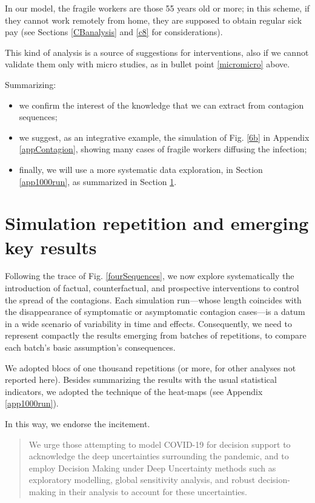 \documentclass[11pt]{article}
\begin{document}
In our model, the fragile workers are those 55 years old or more; in this scheme, if they cannot work remotely from home, they are supposed to obtain regular sick pay (see Sections \ref{CBanalysis} and \ref{c8} for considerations).

This kind of analysis is a source of suggestions for interventions, also if we cannot validate them only with micro studies, as in bullet point \ref{micromicro} above. 

Summarizing: 

\begin{itemize}
\setlength{\itemsep}{0pt}
\item we confirm the interest of the knowledge that we can extract from contagion sequences; 
\item we suggest, as an integrative example, the simulation of Fig. \ref{6b}  in Appendix \ref{appContagion}, showing many cases of fragile workers diffusing the infection;
\item finally, we will use a more systematic data exploration, in Section \ref{app1000run}, as summarized in Section \ref{keyResultsS}.
\end{itemize}


\section{Simulation repetition and emerging key results}
\label{keyResultsS}

Following the trace of Fig. \ref{fourSequences}, we now explore systematically the introduction of factual, counterfactual, and prospective interventions to control the spread of the contagions. Each simulation run---whose length coincides with the disappearance of symptomatic or asymptomatic contagion cases---is a datum in a wide scenario of variability in time and effects. Consequently, we need to represent compactly the results emerging from batches of repetitions, to compare each batch's basic assumption's consequences.

We adopted blocs of one thousand repetitions (or more, for other analyses not reported here). Besides summarizing the results with the usual statistical indicators, we adopted the technique of the heat-maps (see Appendix \ref{app1000run}). 

In this way, we endorse the \cite{steinmann2020don} incitement.
\begin{quote}
We urge those attempting to model COVID-19 for decision support to acknowledge the deep uncertainties surrounding the pandemic, and to employ Decision Making under Deep Uncertainty methods such as exploratory modelling, global sensitivity analysis, and robust decision-making in their analysis to account for these uncertainties.
\end{quote}
\end{document}

